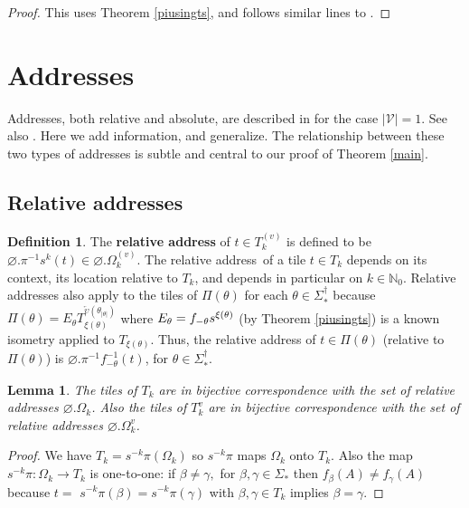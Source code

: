 \documentclass{amsproc}
\theoremstyle{plain}
\newtheorem{lemma}{Lemma}
\theoremstyle{definition}
\newtheorem{definition}{Definition}
\numberwithin{equation}{section}
\begin{document}
\begin{proof}
This uses Theorem \ref{piusingts}, and follows similar lines to \cite[proof
of Theorem 2]{barnsleyvince}.
\end{proof}

\section{\label{localsec}Addresses}

Addresses, both relative and absolute, are described in \cite{barnsleyvince}
for the case $\left\vert \mathcal{V}\right\vert =1$. See also \cite{bandt2}.
Here we add information, and generalize. The relationship between these two
types of addresses is subtle and central to our proof of Theorem \ref{main}.

\subsection{Relative addresses}

\begin{definition}
\label{relativedef}The \textbf{relative address} of $t\in T_{k}^{(v)}$ is
defined to be $\varnothing.\pi^{-1}s^{k}(t)\in\varnothing.\Omega_{k}^{(v)}$.
The relative address\textit{\ }of a tile $t\in T_{k}$ depends on its
context, its location relative to $T_{k}$, and depends in particular on $%
k\in \mathbb{N}_{0}$. Relative addresses also apply to the tiles of $%
\Pi(\theta)$ for each $\theta\in\Sigma_{\ast}^{\dag}$ because $%
\Pi(\theta)=E_{\theta}T_{\xi(\theta)}^{\overleftarrow{\upsilon}%
(\theta_{\left\vert \theta\right\vert })}$ where $E_{\theta}=f_{-\theta}s^{%
\xi(\theta)}$ (by Theorem \ref{piusingts}) is a known isometry applied to $%
T_{\xi(\theta)}$. Thus, the relative address of $t\in\Pi(\theta)$ (relative
to $\Pi(\theta)$) is $\varnothing.\pi ^{-1}f_{-\theta}^{-1}(t)$, for $%
\theta\in\Sigma_{\ast}^{\dag}$.
\end{definition}

\begin{lemma}
The tiles of $T_{k}$ are in bijective correspondence with the set of
relative addresses $\varnothing.\Omega_{k}$. Also the tiles of $T_{k}^{v}$
are in bijective correspondence with the set of relative addresses $%
\varnothing .\Omega_{k}^{v}$.
\end{lemma}

\begin{proof}
We have $T_{k}=s^{-k}\pi(\Omega_{k})$ so $s^{-k}\pi$ maps $\Omega_{k}$ onto $%
T_{k}$. Also the map $s^{-k}\pi:\Omega_{k}\rightarrow T_{k}$ is one-to-one:
if $\beta\neq\gamma,$ for $\beta,\gamma\in\Sigma_{\ast}$ then $f_{\beta
}(A)\neq f_{\gamma}(A)$ because $t=$ $s^{-k}\pi(\beta)=s^{-k}\pi(\gamma)$%
with $\beta,\gamma\in T_{k}$ implies $\beta=\gamma$.
\end{proof}
\end{document}
